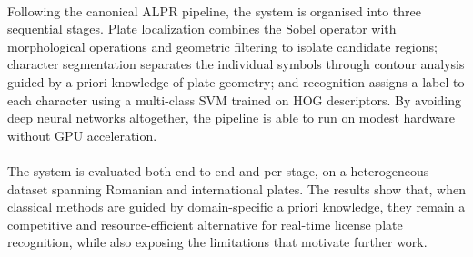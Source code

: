 \documentclass[12pt]{report}
\begin{document}
\paragraph{}
Following the canonical ALPR pipeline, the system is organised into three sequential stages.
Plate localization combines the Sobel operator with morphological operations and geometric
filtering to isolate candidate regions; character segmentation separates the individual
symbols through contour analysis guided by a priori knowledge of plate geometry; and
recognition assigns a label to each character using a multi-class SVM trained on HOG
descriptors. By avoiding deep neural networks altogether, the pipeline is able to run on
modest hardware without GPU acceleration.
\paragraph{}
The system is evaluated both end-to-end and per stage, on a heterogeneous dataset spanning
Romanian and international plates. The results show that, when classical methods are guided by
domain-specific a priori knowledge, they remain a competitive and resource-efficient
alternative for real-time license plate recognition, while also exposing the limitations that
motivate further work.
\tableofcontents

\newpage
{}










\end{document}
